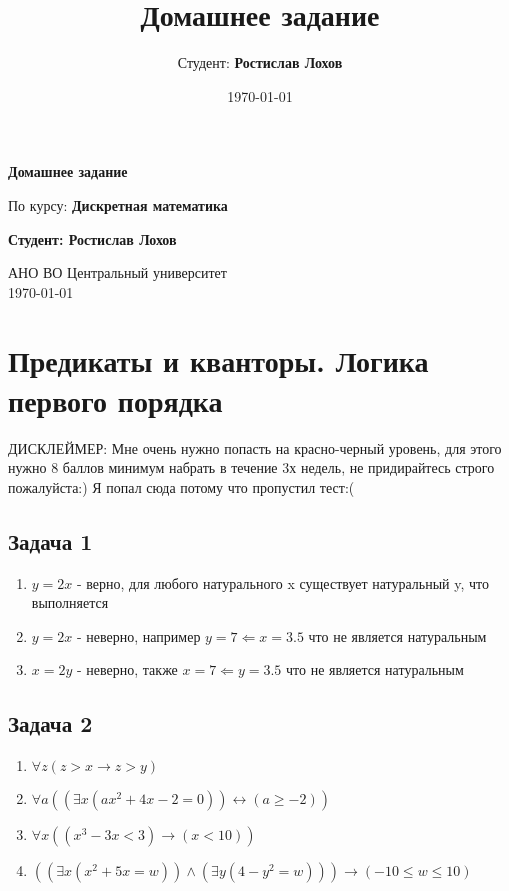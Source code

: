 \documentclass[a4paper,12pt]{article}
\title{Домашнее задание}
\author{Студент: \textbf{Ростислав Лохов}}
\date{\today}
\begin{document}
\begin{titlepage}
    \centering
    \vspace*{1cm}

    \Huge
    \textbf{Домашнее задание}

    \vspace{0.5cm}
    \LARGE
    По курсу: \textbf{Дискретная математика}

    \vspace{1.5cm}

    \textbf{Студент: Ростислав Лохов}

    \vfill

    \Large
    АНО ВО Центральный университет\\
    \vspace{0.3cm}
    \today

\end{titlepage}

\tableofcontents
\newpage

\section{Предикаты и кванторы. Логика первого порядка}

ДИСКЛЕЙМЕР: Мне очень нужно попасть на красно-черный уровень, для этого нужно 8  баллов минимум набрать в течение 3х недель, не придирайтесь строго пожалуйста:) Я попал сюда потому что пропустил тест:(

\subsection{Задача 1}
\begin{enumerate}
    \item $y=2x$ - верно, для любого натурального x существует натуральный y, что выполняется
    \item $y=2x$ - неверно, например $y=7 \Leftarrow x=3.5$ что не является натуральным
    \item $x=2y$ - неверно, также $x=7 \Leftarrow y=3.5$ что не является натуральным
\end{enumerate}

\subsection{Задача 2}
\begin{enumerate}
    \item $\forall z(z > x \to z > y)$
    \item $\forall a((\exists x (ax^2+4x-2=0))\leftrightarrow (a \ge -2))$
    \item $\forall x((x^3-3x<3) \to (x < 10))$
    \item $((\exists x(x^2+5x=w))\land(\exists y (4-y^2=w))) \to (-10 \le w \le 10)$
\end{enumerate}
\end{document}
